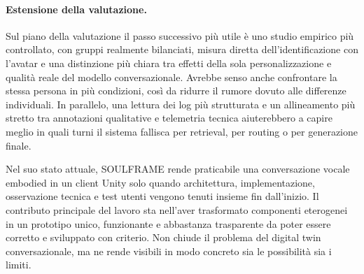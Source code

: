 \paragraph{Estensione della valutazione.}
Sul piano della valutazione il passo successivo più utile è uno studio empirico più controllato, con gruppi realmente bilanciati, misura diretta dell'identificazione con l'avatar e una distinzione più chiara tra effetti della sola personalizzazione e qualità reale del modello conversazionale. Avrebbe senso anche confrontare la stessa persona in più condizioni, così da ridurre il rumore dovuto alle differenze individuali. In parallelo, una lettura dei log più strutturata e un allineamento più stretto tra annotazioni qualitative e telemetria tecnica aiuterebbero a capire meglio in quali turni il sistema fallisca per retrieval, per routing o per generazione finale.

\label{sec:finali}
Nel suo stato attuale, SOULFRAME rende praticabile una conversazione vocale embodied in un client Unity solo quando architettura, implementazione, osservazione tecnica e test utenti vengono tenuti insieme fin dall'inizio. Il contributo principale del lavoro sta nell'aver trasformato componenti eterogenei in un prototipo unico, funzionante e abbastanza trasparente da poter essere corretto e sviluppato con criterio. Non chiude il problema del digital twin conversazionale, ma ne rende visibili in modo concreto sia le possibilità sia i limiti.
